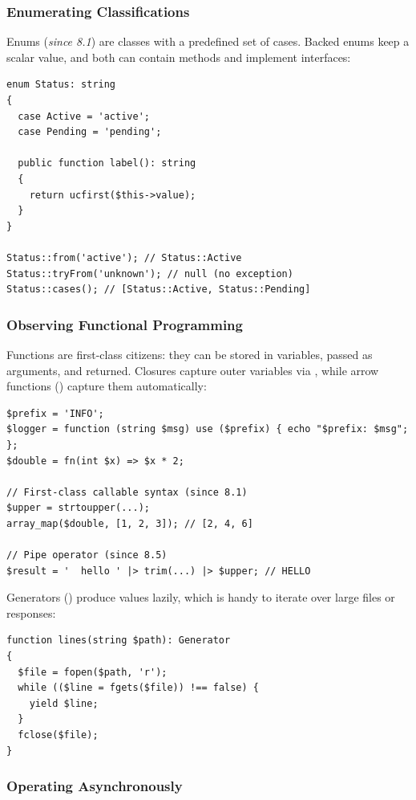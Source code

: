 \subsubsection{Enumerating Classifications}

Enums (\emph{since 8.1}) are classes with a predefined set of cases. Backed enums keep a scalar
value, and both can contain methods and implement interfaces:

\begin{lstlisting}
enum Status: string
{
  case Active = 'active';
  case Pending = 'pending';

  public function label(): string
  {
    return ucfirst($this->value);
  }
}

Status::from('active'); // Status::Active
Status::tryFrom('unknown'); // null (no exception)
Status::cases(); // [Status::Active, Status::Pending]
\end{lstlisting}


\subsubsection{Observing Functional Programming}

Functions are first-class citizens: they can be stored in variables, passed as arguments, and
returned. Closures capture outer variables via , while arrow functions () capture
them automatically:

\begin{lstlisting}
$prefix = 'INFO';
$logger = function (string $msg) use ($prefix) { echo "$prefix: $msg"; };
$double = fn(int $x) => $x * 2;

// First-class callable syntax (since 8.1)
$upper = strtoupper(...);
array_map($double, [1, 2, 3]); // [2, 4, 6]

// Pipe operator (since 8.5)
$result = '  hello ' |> trim(...) |> $upper; // HELLO
\end{lstlisting}

\noindent Generators () produce values lazily, which is handy to iterate over large
files or responses:

\begin{lstlisting}
function lines(string $path): Generator
{
  $file = fopen($path, 'r');
  while (($line = fgets($file)) !== false) {
    yield $line;
  }
  fclose($file);
}
\end{lstlisting}


\subsubsection{Operating Asynchronously}

